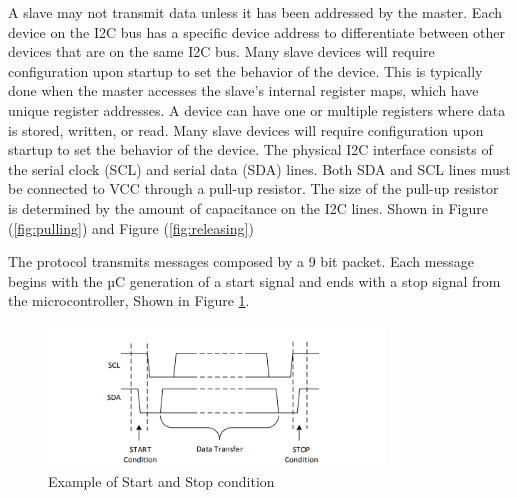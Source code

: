\documentclass[english]{article}
\begin{document}
A slave may not transmit data unless it has been addressed by the master. 
Each device on the I2C bus has a specific device address to differentiate between
other devices that are on the same I2C bus. Many slave devices will require configuration upon startup to set the behavior of
the device. This is typically done when the master accesses the slave's internal
register maps, which have unique register addresses. A device can have one or
multiple registers where data is stored, written, or read. Many slave devices will require configuration upon startup to set the behavior of
the device. The physical I2C interface consists of the serial clock (SCL) and serial data (SDA) lines. 
Both SDA and SCL lines must be connected to VCC through a pull-up resistor. The size
of the pull-up resistor is determined by the amount of capacitance on the I2C lines.
Shown in Figure (\ref{fig:pulling}) and Figure (\ref{fig:releasing})
\begin{figure}[!ht]
	\centering
	\caption{}
\end{figure}
\newpage
The protocol transmits messages composed by a 9 bit packet. Each message begins with
 the µC generation of a start signal and ends with a stop signal from the microcontroller,
 Shown in Figure \ref{fig:Stop}.
 \begin{figure}[!h]
	\centering
	\includegraphics[width=0.80\textwidth,]{figures/Start-Stop.png}
	\caption{Example of Start and Stop condition}
	\label{fig:Stop}
\end{figure}
\end{document}
